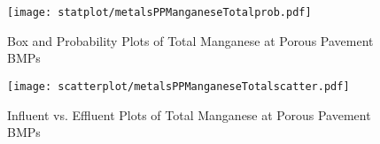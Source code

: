         \begin{figure}[hb]   %
            \centering
            \texttt{[image: statplot/metalsPPManganeseTotalprob.pdf]}
            \caption{Box and Probability Plots of Total Manganese at Porous Pavement BMPs}
        \end{figure}         %
        
        
        \begin{figure}[hb]   %
            \centering
            \texttt{[image: scatterplot/metalsPPManganeseTotalscatter.pdf]}
            \caption{Influent vs. Effluent Plots of Total Manganese at Porous Pavement BMPs}
        \end{figure}         %
        \clearpage
        